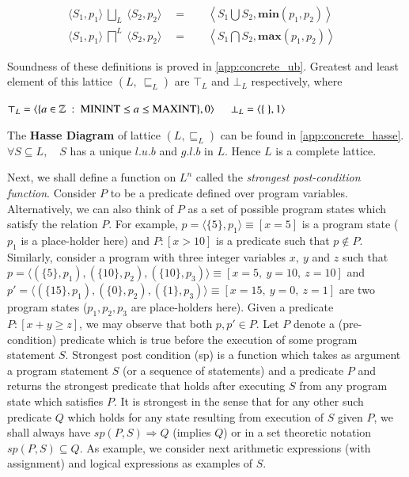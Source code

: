 \documentclass[final,3p, review, times]{Elsevier/elsarticle}
\begin{document}
\begin{align}
  \langle S_1,p_1\rangle\ \bigsqcup_L\ \langle S_2,p_2\rangle\quad=\quad&\left\langle S_1\bigcup S_2, \textbf{min}(p_1,p_2)\right\rangle&\label{eq:lub_L}\\
  \langle S_1,p_1\rangle\ \bigsqcap^L\ \langle S_2,p_2\rangle\quad=\quad&\left\langle S_1\bigcap S_2, \textbf{max}(p_1,p_2)\right\rangle&\label{eq:glb_L}
\end{align}

Soundness of these definitions is proved in \ref{app:concrete_ub}. Greatest and least element of this lattice $(L,\ \sqsubseteq_L)$ are $\top_L$ and $\bot_L$ respectively, where

$
\top_L=\langle\{a\in\mathbb{Z}\ :\ \mathrm{MININT}\leq a\leq\mathrm{MAXINT}\}, 0\rangle \\
\indent\bot_L=\langle\{\ \}, 1\rangle
$

\noindent The \textbf{Hasse Diagram} of lattice $(L,\sqsubseteq_L)$ can be found in \ref{app:concrete_hasse}. $\forall S\subseteq L,\quad S$ has a unique $l.u.b$ and $g.l.b$ in $L$. Hence $L$ is a complete lattice.

Next, we shall define a function on $L^n$ called the \textit{strongest post-condition function}\cite{lara13}. Consider $P$ to be a predicate defined over program variables. Alternatively, we can also think of $P$ as a set of possible program states which satisfy the relation $P$. For example, $p=\langle\{5\},p_1\rangle\equiv[x=5]$ is a program state ($p_1$ is a place-holder here) and $P:[x>10]$ is a predicate such that $p\notin P$. Similarly, consider a program with three integer variables $x,\ y$ and $z$ such that $p=\langle(\{5\},p_1),(\{10\},p_2),(\{10\},p_3)\rangle\equiv[x=5,\ y=10,\ z=10]$ and $p'=\langle(\{15\},p_1),(\{0\},p_2),(\{1\},p_3)\rangle\equiv[x=15,\ y=0,\ z=1]$ are two program states ($p_1,p_2,p_3$ are place-holders here). Given a predicate $P:[x+y\geq z]$, we may observe that both $p,p'\in P$. Let $P$ denote a (pre-condition) predicate which is true before the execution of some program statement $S$. Strongest post condition (sp) is a function which takes as argument a program statement $S$ (or a sequence of statements) and a predicate $P$ and returns the strongest predicate that holds after executing $S$ from any program state which satisfies $P$. It is strongest in the sense that for any other such predicate $Q$ which holds for any state resulting from execution of $S$ given $P$, we shall always have $sp(P,S)\Rightarrow Q$ (implies $Q$) or in a set theoretic notation $sp(P,S)\subseteq Q$. As example, we consider next arithmetic expressions (with assignment) and logical expressions as examples of $S$.
\end{document}
